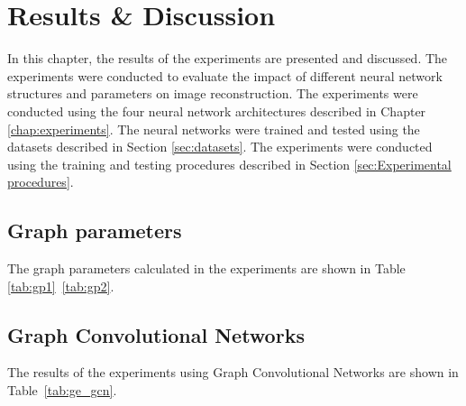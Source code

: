 \chapter{Results \& Discussion}\label{chap:results}

In this chapter, the results of the experiments are presented and discussed. The experiments were conducted to evaluate the impact of different neural network structures and parameters on image reconstruction. The experiments were conducted using the four neural network architectures described in Chapter \ref{chap:experiments}. The neural networks were trained and tested using the datasets described in Section \ref{sec:datasets}. The experiments were conducted using the training and testing procedures described in Section \ref{sec:Experimental procedures}.

\section{Graph parameters}

The graph parameters calculated in the experiments are shown in Table \ref{tab:gp1}~\ref{tab:gp2}. 

\section{Graph Convolutional Networks}
The results of the experiments using Graph Convolutional Networks are shown in Table~\ref{tab:ge_gcn}.

